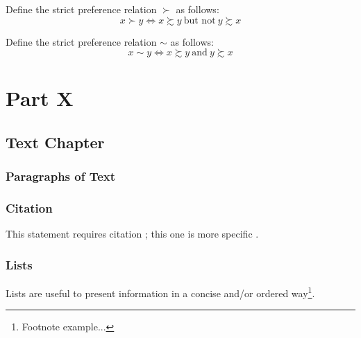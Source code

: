 \documentclass[11pt,fleqn]{book} %
\begin{document}
\begin{definition}
	Define the strict preference relation $\succ$ as follows:
	\[	
	x\succ y \Longleftrightarrow x\succsim y \ \text{but not}\  y\succsim x
	\]
\end{definition}

\begin{definition}
	Define the strict preference relation $\sim$ as follows:
	\[	
	x\sim y \Longleftrightarrow x\succsim y \ \text{and}\  y\succsim x
	\]
\end{definition}

\part{Part X}



\chapter{Text Chapter}

\section{Paragraphs of Text}

\lipsum[1-7] %


\section{Citation}

This statement requires citation \cite{book_key}; this one is more specific \cite[122]{article_key}.


\section{Lists}

Lists are useful to present information in a concise and/or ordered way\footnote{Footnote example...}.
\end{document}
